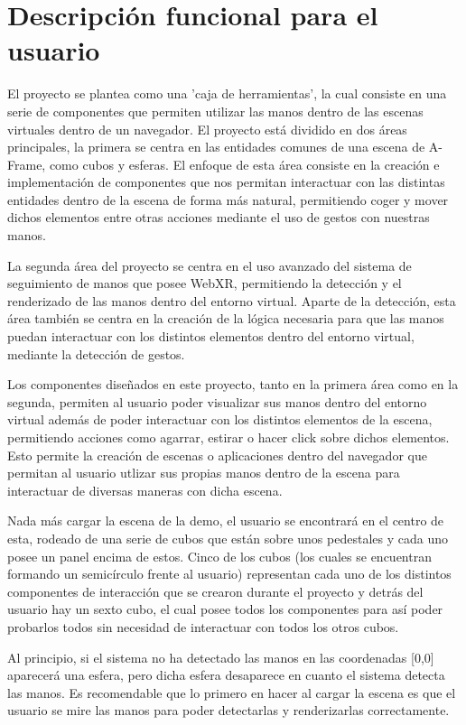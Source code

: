 \documentclass[a4paper, 12pt]{book}
\begin{document}
\section{Descripción funcional para el usuario}
\label{sec:manual-usuario}
El proyecto se plantea como una 'caja de herramientas', la cual consiste en una serie de componentes que permiten utilizar las manos dentro de las escenas virtuales dentro de un navegador. El proyecto está dividido en dos áreas principales, la primera se centra en las entidades comunes de una escena de A-Frame, como cubos y esferas. El enfoque de esta área consiste en la creación e implementación de componentes que nos permitan interactuar con las distintas entidades dentro de la escena de forma más natural, permitiendo coger y mover dichos elementos entre otras acciones mediante el uso de gestos con nuestras manos.

La segunda área del proyecto se centra en el uso avanzado del sistema de seguimiento de manos que posee WebXR, permitiendo la detección y el renderizado de las manos dentro del entorno virtual. Aparte de la detección, esta área también se centra en la creación de la lógica necesaria para que las manos puedan interactuar con los distintos elementos dentro del entorno virtual, mediante la detección de gestos.

Los componentes diseñados en este proyecto, tanto en la primera área como en la segunda, permiten al usuario poder visualizar sus manos dentro del entorno virtual además de poder interactuar con los distintos elementos de la escena, permitiendo acciones como agarrar, estirar o hacer click sobre dichos elementos. Esto permite la creación de escenas o aplicaciones dentro del navegador que permitan al usuario utlizar sus propias manos dentro de la escena para interactuar de diversas maneras con dicha escena. 

Nada más cargar la escena de la demo, el usuario se encontrará en el centro de esta, rodeado de una serie de cubos que están sobre unos pedestales y cada uno posee un panel encima de estos. Cinco de los cubos (los cuales se encuentran formando un semicírculo frente al usuario) representan cada uno de los distintos componentes de interacción que se crearon durante el proyecto y detrás del usuario hay un sexto cubo, el cual posee todos los componentes para así poder probarlos todos sin necesidad de interactuar con todos los otros cubos.

Al principio, si el sistema no ha detectado las manos en las coordenadas [0,0] aparecerá una esfera, pero dicha esfera desaparece en cuanto el sistema detecta las manos. Es recomendable que lo primero en hacer al cargar la escena es que el usuario se mire las manos para poder detectarlas y renderizarlas correctamente. 
\end{document}
